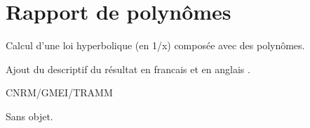 %
\section{Rapport de polyn\^omes}

 

Calcul d'une loi hyperbolique (en 1/x) 
compos\'ee avec des polyn\^omes.

Ajout du descriptif du r\'esultat en francais et en anglais .

\bigskip





CNRM/GMEI/TRAMM

Sans objet.
